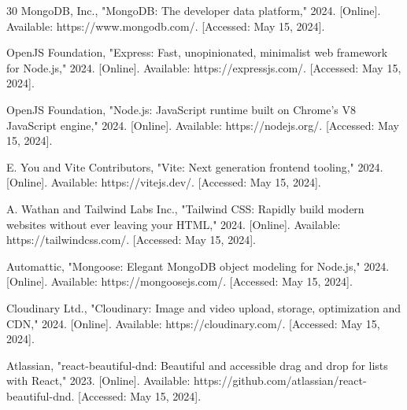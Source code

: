 \begin{thebibliography}{30}
MongoDB, Inc., "MongoDB: The developer data platform," 2024. [Online]. Available: https://www.mongodb.com/. [Accessed: May 15, 2024].

OpenJS Foundation, "Express: Fast, unopinionated, minimalist web framework for Node.js," 2024. [Online]. Available: https://expressjs.com/. [Accessed: May 15, 2024].

OpenJS Foundation, "Node.js: JavaScript runtime built on Chrome's V8 JavaScript engine," 2024. [Online]. Available: https://nodejs.org/. [Accessed: May 15, 2024].

E. You and Vite Contributors, "Vite: Next generation frontend tooling," 2024. [Online]. Available: https://vitejs.dev/. [Accessed: May 15, 2024].

A. Wathan and Tailwind Labs Inc., "Tailwind CSS: Rapidly build modern websites without ever leaving your HTML," 2024. [Online]. Available: https://tailwindcss.com/. [Accessed: May 15, 2024].

Automattic, "Mongoose: Elegant MongoDB object modeling for Node.js," 2024. [Online]. Available: https://mongoosejs.com/. [Accessed: May 15, 2024].

Cloudinary Ltd., "Cloudinary: Image and video upload, storage, optimization and CDN," 2024. [Online]. Available: https://cloudinary.com/. [Accessed: May 15, 2024].

Atlassian, "react-beautiful-dnd: Beautiful and accessible drag and drop for lists with React," 2023. [Online]. Available: https://github.com/atlassian/react-beautiful-dnd. [Accessed: May 15, 2024].

\end{thebibliography}
